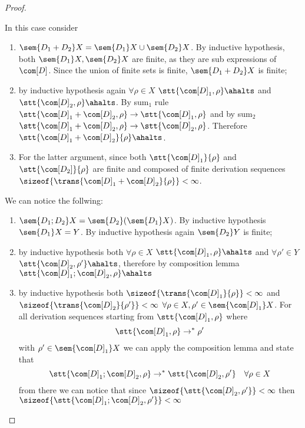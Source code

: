 \begin{proof}
\begin{inductive}
    \case{\({\com[D]} = \com[D_1 + D_2]\)} In this case consider
    \begin{enumerate}[label=(\roman*).]
    \item \(\sem{D_1 + D_2} X = \sem{D_1}X \cup \sem{D_2}X\). By
      inductive hypothesis, both \(\sem{D_1}X, \sem{D_2}X\) are
      finite, as they are sub expressions of \({\com[D]}\). Since the
      union of finite sets is finite, \(\sem{D_1 + D_2}X\) is finite;
    \item by inductive hypothesis again \(\forall \rho \in X\)
      \(\stt{{\com[D]}_1, \rho}\ahalts\) and
      \(\stt{{\com[D]}_2, \rho}\ahalts\). By sum\(_1\) rule
      \(\stt{{\com[D]}_1 + {\com[D]}_2, \rho} \to \stt{{\com[D]}_1, \rho}\)
      and by sum\(_2\)
      \(\stt{{\com[D]}_1 + {\com[D]}_2, \rho} \to \stt{{\com[D]}_2,
        \rho}\). Therefore
      \(\stt{{\com[D]}_1 + {\com[D]}_2}{\rho}\ahalts\).
    \item For the latter argument, since both
      \(\stt{{\com[D]}_1}{\rho}\) and \(\stt{\com[D_2]}{\rho}\) are
      finite and composed of finite derivation sequences
      \(\sizeof{\trans{{\com[D]}_1 + {\com[D]}_2}{\rho}} < \infty\).
    \end{enumerate}
    \case{\({\com[D]} = \com[D_1; D_2]\)} We can notice the
    follwing:
    \begin{enumerate}[label=(\roman*).]
    \item \(\sem{D_1;D_2}X = \sem{D_2}(\sem{D_1}X)\). By inductive
      hypothesis \(\sem{D_1}X = Y\). By inductive hypothesis again
      \(\sem{D_2}Y\) is finite;
    \item by inductive hypothesis both \(\forall \rho \in X\)
      \(\stt{{\com[D]}_1, \rho}\ahalts\) and \(\forall \rho' \in Y\)
      \(\stt{{\com[D]}_2,\rho'}\ahalts\), therefore by composition
      lemma \(\stt{{\com[D]}_1;{\com[D]}_2, \rho} \ahalts\)
    \item by inductive hypothesis both
      \(\sizeof{\trans{{\com[D]}_1}{\rho}} < \infty\) and
      \(\sizeof{\trans{{\com[D]}_2}{\rho'}} < \infty\)
      \(\forall \rho \in X, \rho'\in \sem{{\com[D]}_1}X\). For all
      derivation sequences starting from \(\stt{{\com[D]}_1, \rho}\)
      where \[\stt{{\com[D]}_1, \rho} \to^* \rho'\] with
      \(\rho'\in \sem{{\com[D]}_1}X\) we can apply the composition lemma
      and state that
      \[\stt{{\com[D]}_1;{\com[D]}_2, \rho} \to^* \stt{{\com[D]}_2, \rho'} \quad
        \forall \rho \in X\] from there we can notice that since
      \(\sizeof{\stt{{\com[D]}_2, \rho'}} < \infty\) then
      \(\sizeof{\stt{{\com[D]}_1;{\com[D]}_2, \rho'}} < \infty\)
    \end{enumerate}
  \end{inductive}
\end{proof}


